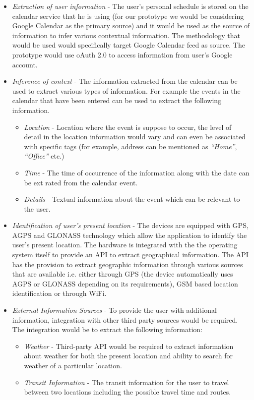 \documentclass[12pt]{report}
\begin{document}
\begin{itemize}
\item \textit{Extraction of user information} - The user's personal schedule is stored on the calendar service that he is using (for our prototype we would be considering Google Calendar as the primary source) and it would be used as the source of information to infer various contextual information. The methodology that would be used would specifically target Google Calendar feed as source. The prototype would use oAuth 2.0 to access information from user's Google account. 

\item \textit{Inference of context} - The information extracted from the calendar can be used to extract various types of information. For example the events in the calendar that have been entered can be used to extract the following information.
\begin{itemize}
\item \textit{Location} - Location where the event is suppose to occur, the level of detail in the location information would vary and can even be associated with specific tags (for example, address can be mentioned as \textit{``Home''}, \textit{``Office''} etc.)
\item \textit{Time} - The time of occurrence of the information along with the date can be ext rated from the calendar event.
\item \textit{Details} - Textual information about the event which can be relevant to the user.
\end{itemize}

\item \textit{Identification of user's present location} - The devices are equipped with GPS, AGPS and GLONASS technology which allow the application to identify the user's present location. The hardware is integrated with the the operating system itself to provide an API to extract geographical information. The API has the provision to extract geographic information through various sources that are available i.e. either through GPS (the device automatically uses AGPS or GLONASS depending on its requirements), GSM based location identification or through WiFi.

\item \textit{External Information Sources} - To provide the user with additional information, integration with other third party sources would be required. The integration would be to extract the following information:
\begin{itemize}
\item \textit{Weather} - Third-party API would be required to extract information about weather for both the present location and ability to search for weather of a particular location.
\item \textit{Transit Information} - The transit information for the user to travel between two locations including the possible travel time and routes.
\end{itemize}
\end{itemize}
\end{document}
